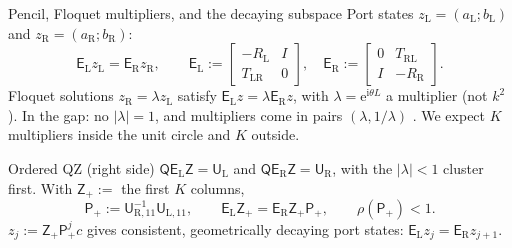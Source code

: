 \documentclass[aspectratio=169]{beamer}
\newcommand{\ii}{\mathrm{i}}
\newcommand{\ee}{\mathrm{e}}
\begin{document}
\begin{frame}{Pencil, Floquet multipliers, and the decaying subspace}
  \small
  Port states $z_{\mathrm L}=(a_{\mathrm L};b_{\mathrm L})$ and
  $z_{\mathrm R}=(a_{\mathrm R};b_{\mathrm R})$:
  \[
    \mathsf E_{\mathrm L}z_{\mathrm L}=\mathsf E_{\mathrm R}z_{\mathrm R},\qquad
    \mathsf E_{\mathrm L}:=\begin{bmatrix}-R_{\mathrm L}&I\\ T_{\mathrm{LR}}&0\end{bmatrix},\quad
    \mathsf E_{\mathrm R}:=\begin{bmatrix}0&T_{\mathrm{RL}}\\ I&-R_{\mathrm R}\end{bmatrix}.
  \]
  Floquet solutions $z_{\mathrm R}=\lambda z_{\mathrm L}$ satisfy
  $\mathsf E_{\mathrm L}z=\lambda\mathsf E_{\mathrm R}z$, with $\lambda=\ee^{\ii\theta L}$
  a multiplier (not $k^2$). In the gap: no $|\lambda|=1$, and multipliers come in pairs
  $(\lambda,1/\lambda)$ \cite[Thm.~6.1]{JolyLiFliss2006}. We expect $K$ multipliers
  inside the unit circle and $K$ outside.

  \begin{block}{Ordered QZ (right side)}
    $\mathsf Q\mathsf E_{\mathrm L}\mathsf Z=\mathsf U_{\mathrm L}$ and
    $\mathsf Q\mathsf E_{\mathrm R}\mathsf Z=\mathsf U_{\mathrm R}$, with the $|\lambda|<1$
    cluster first. With $\mathsf Z_+:=$ the first $K$ columns,
    \[
      \mathsf P_+:=\mathsf U_{\mathrm R,11}^{-1}\mathsf U_{\mathrm L,11},\qquad
      \mathsf E_{\mathrm L}\mathsf Z_+=\mathsf E_{\mathrm R}\mathsf Z_+\mathsf P_+,\qquad
      \rho(\mathsf P_+)<1.
    \]
    $z_j:=\mathsf Z_+\mathsf P_+^jc$ gives consistent, geometrically decaying port states:
    $\mathsf E_{\mathrm L}z_j=\mathsf E_{\mathrm R}z_{j+1}$.
  \end{block}
\end{frame}
\end{document}
